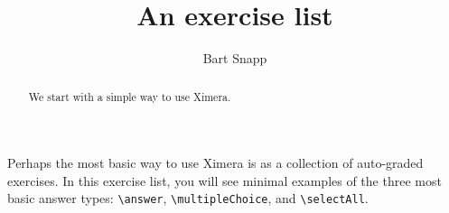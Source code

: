 \documentclass{ximera}
\author{Bart Snapp}
\title{An exercise list}
\begin{document}
\begin{abstract}
    We start with a simple way to use Ximera.
\end{abstract}
\maketitle

Perhaps the most basic way to use Ximera is as a collection of auto-graded
exercises. In this exercise list, you will see minimal examples of the three
most basic answer
types: \verb|\answer|, \verb|\multipleChoice|, and \verb|\selectAll|.
\end{document}
